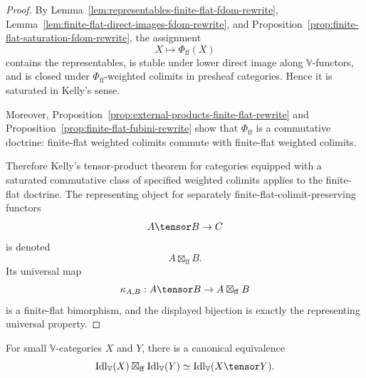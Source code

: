 \begin{proof}
By Lemma~\ref{lem:representables-finite-flat-fdom-rewrite},
Lemma~\ref{lem:finite-flat-direct-images-fdom-rewrite}, and
Proposition~\ref{prop:finite-flat-saturation-fdom-rewrite}, the assignment
\[
    X\longmapsto \Phi_{\mathrm{ff}}(X)
\]
contains the representables, is stable under lower direct image along
\(\mathbb V\)-functors, and is closed under \(\Phi_{\mathrm{ff}}\)-weighted
colimits in presheaf categories.  Hence it is saturated in Kelly's sense.

Moreover, Proposition~\ref{prop:external-products-finite-flat-rewrite} and
Proposition~\ref{prop:finite-flat-fubini-rewrite} show that
\(\Phi_{\mathrm{ff}}\) is a commutative doctrine: finite-flat weighted colimits
commute with finite-flat weighted colimits.

Therefore Kelly's tensor-product theorem for categories equipped with a
saturated commutative class of specified weighted colimits applies to the
finite-flat doctrine.  The representing object for separately
finite-flat-colimit-preserving functors
\[
    A\tensor B\to C
\]
is denoted
\[
    A\boxtimes_{\mathrm{ff}}B.
\]
Its universal map
\[
    \kappa_{A,B}:A\tensor B\to A\boxtimes_{\mathrm{ff}}B
\]
is a finite-flat bimorphism, and the displayed bijection is exactly the
representing universal property.
\end{proof}

\begin{corollary}
\label{cor:tensor-free-fdom-rewrite}
For small \(\mathbb V\)-categories \(X\) and \(Y\), there is a canonical
equivalence
\[
    \operatorname{Idl}_{\mathbb V}(X)
    \boxtimes_{\mathrm{ff}}
    \operatorname{Idl}_{\mathbb V}(Y)
    \simeq
    \operatorname{Idl}_{\mathbb V}(X\tensor Y).
\]
\end{corollary}

